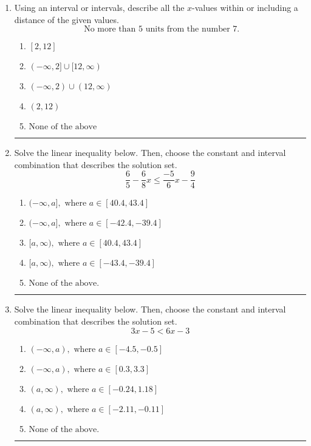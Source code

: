 \documentclass[14pt]{extbook}
\newcommand{\litem}[1]{\item#1\hspace*{-1cm}\rule{\textwidth}{0.4pt}}
\begin{document}
\begin{enumerate}
{\begin{enumerate}[label=\Alph*.]
\end{enumerate} }
\litem{
Using an interval or intervals, describe all the $x$-values within or including a distance of the given values.\[ \text{ No more than } 5 \text{ units from the number } 7. \]\begin{enumerate}[label=\Alph*.]
\item \( [2, 12] \)
\item \( (-\infty, 2] \cup [12, \infty) \)
\item \( (-\infty, 2) \cup (12, \infty) \)
\item \( (2, 12) \)
\item \( \text{None of the above} \)

\end{enumerate} }
\litem{
Solve the linear inequality below. Then, choose the constant and interval combination that describes the solution set.\[ \frac{6}{5} - \frac{6}{8} x \leq \frac{-5}{6} x - \frac{9}{4} \]\begin{enumerate}[label=\Alph*.]
\item \( (-\infty, a], \text{ where } a \in [40.4, 43.4] \)
\item \( (-\infty, a], \text{ where } a \in [-42.4, -39.4] \)
\item \( [a, \infty), \text{ where } a \in [40.4, 43.4] \)
\item \( [a, \infty), \text{ where } a \in [-43.4, -39.4] \)
\item \( \text{None of the above}. \)

\end{enumerate} }
\litem{
Solve the linear inequality below. Then, choose the constant and interval combination that describes the solution set.\[ 3x -5 < 6x -3 \]\begin{enumerate}[label=\Alph*.]
\item \( (-\infty, a), \text{ where } a \in [-4.5, -0.5] \)
\item \( (-\infty, a), \text{ where } a \in [0.3, 3.3] \)
\item \( (a, \infty), \text{ where } a \in [-0.24, 1.18] \)
\item \( (a, \infty), \text{ where } a \in [-2.11, -0.11] \)
\item \( \text{None of the above}. \)

\end{enumerate} }
\end{enumerate}
\end{document}
